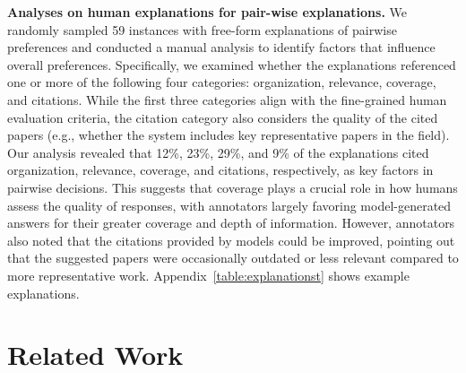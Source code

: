 \documentclass{article} %
\renewcommand{\paragraph}[1]{\noindent \textbf{#1}}
\begin{document}
\paragraph{Analyses on human explanations for pair-wise explanations.}  
We randomly sampled 59 instances with free-form explanations of pairwise preferences and conducted a manual analysis to identify factors that influence overall preferences. Specifically, we examined whether the explanations referenced one or more of the following four categories: organization, relevance, coverage, and citations. While the first three categories align with the fine-grained human evaluation criteria, the citation category also considers the quality of the cited papers (e.g., whether the system includes key representative papers in the field). 
Our analysis revealed that 12\%, 23\%, 29\%, and 9\% of the explanations cited organization, relevance, coverage, and citations, respectively, as key factors in pairwise decisions. This suggests that coverage plays a crucial role in how humans assess the quality of responses, with annotators largely favoring model-generated answers for their greater coverage and depth of information. However, annotators also noted that the citations provided by models could be improved, pointing out that the suggested papers were occasionally outdated or less relevant compared to more representative work. Appendix~\ref{table:explanationst} shows example explanations. 



\section{Related Work}

\end{document}
